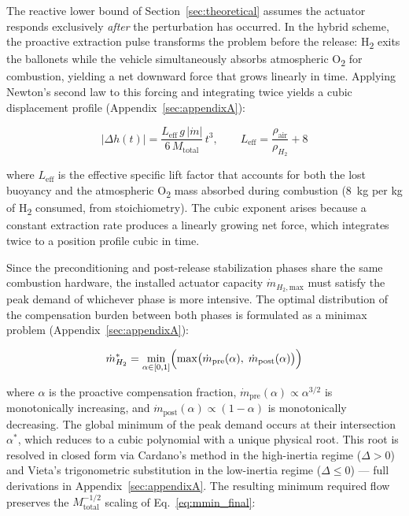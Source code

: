\documentclass[applsci,article,submit,pdftex,moreauthors]{Definitions/mdpi}
\newcommand{\dotmmax}{\dot{m}_{H_2,\text{max}}}
\newcommand{\dotmstar}{\dot{m}_{H_2}^{*}}
\newcommand{\added}[1]{#1}
\begin{document}
\added{The reactive lower bound of Section~\ref{sec:theoretical} assumes the actuator responds exclusively \emph{after} the perturbation has occurred. In the hybrid scheme, the proactive extraction pulse transforms the problem before the release: H\textsubscript{2} exits the ballonets while the vehicle simultaneously absorbs atmospheric O\textsubscript{2} for combustion, yielding a net downward force that grows linearly in time. Applying Newton's second law to this forcing and integrating twice yields a cubic displacement profile (Appendix~\ref{sec:appendixA}):}

\begin{equation}
|\Delta h(t)| = \frac{L_\text{eff}\,g\,|\dot{m}|}{6\,M_\text{total}}\,t^3, \qquad
L_\text{eff} = \frac{\rho_\text{air}}{\rho_{H_2}} + 8
\label{eq:cubic_prec}
\end{equation}

\added{where $L_\text{eff}$ is the effective specific lift factor that accounts for both the lost buoyancy and the atmospheric O\textsubscript{2} mass absorbed during combustion ($8$~kg per kg of H\textsubscript{2} consumed, from stoichiometry). The cubic exponent arises because a constant extraction rate produces a linearly growing net force, which integrates twice to a position profile cubic in time.}

\added{Since the preconditioning and post-release stabilization phases share the same combustion hardware, the installed actuator capacity $\dotmmax$ must satisfy the peak demand of whichever phase is more intensive. The optimal distribution of the compensation burden between both phases is formulated as a minimax problem (Appendix~\ref{sec:appendixA}):}

\begin{equation}
\dotmstar = \min_{\alpha \in [0,1]} \Bigl(\max\bigl(\dot{m}_\text{pre}(\alpha),\;\dot{m}_\text{post}(\alpha)\bigr)\Bigr)
\label{eq:minimax}
\end{equation}

\added{where $\alpha$ is the proactive compensation fraction, $\dot{m}_\text{pre}(\alpha) \propto \alpha^{3/2}$ is monotonically increasing, and $\dot{m}_\text{post}(\alpha) \propto (1-\alpha)$ is monotonically decreasing. The global minimum of the peak demand occurs at their intersection $\alpha^*$, which reduces to a cubic polynomial with a unique physical root. This root is resolved in closed form via Cardano's method in the high-inertia regime ($\Delta > 0$) and Vieta's trigonometric substitution in the low-inertia regime ($\Delta \leq 0$) --- full derivations in Appendix~\ref{sec:appendixA}. The resulting minimum required flow preserves the $M_\text{total}^{-1/2}$ scaling of Eq.~\eqref{eq:mmin_final}:}
\end{document}
